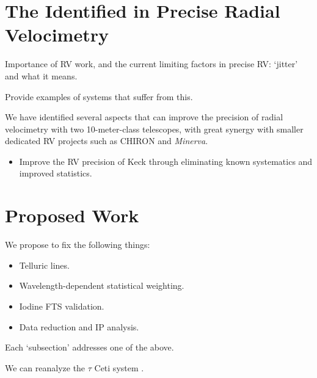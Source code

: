 \documentclass[12pt]{article}
\def\minerva{{\it Minerva}}
\begin{document}
\section{The Identified in Precise Radial Velocimetry}
  
Importance of RV work, and the current limiting factors in precise RV:
`jitter' and what it means.

Provide examples of systems that suffer from this.

We have identified several aspects that can improve the precision of
radial velocimetry with two 10-meter-class telescopes, with great
synergy with smaller dedicated RV projects such as CHIRON and \minerva.

\begin{itemize}[leftmargin=2.2em]
    \vspace{-3pt}
\item Improve the RV precision of Keck through eliminating known
  systematics and improved statistics.
    \vspace{-3pt}
\end{itemize}



\vspace{-3pt}
\section{Proposed Work}

We propose to fix the following things:
\begin{itemize}
  \item Telluric lines.
  \item Wavelength-dependent statistical weighting.
  \item Iodine FTS validation.
  \item Data reduction and IP analysis.
\end{itemize}

Each `subsection' addresses one of the above.

We can reanalyze the $\tau$ Ceti system \citep{tuomi2013}. 

\begin{comment}
\begin{wrapfigure}{r}{0.51\textwidth}
  \vspace{-35pt}
  \begin{center}
    \texttt{[image: 37605]}
  \end{center}
  \vspace{-25pt}  
  \caption{Plot 1.}
  \vspace{-8pt}  
  \label{fit}
\end{wrapfigure}
\end{comment}
\end{document}
